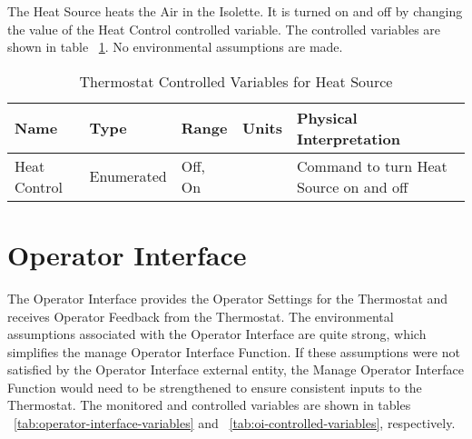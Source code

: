 The Heat Source heats the Air in the Isolette. It is turned on and off by changing the value of the
Heat Control controlled variable. The controlled variables are shown in table ~\ref{tab:heat-source-variables}. No
environmental assumptions are made.

\begin{table}
\begin{tabular}{|l|l|l|l|l|}
\hline
Name & Type & Range & Units & Physical Interpretation \\\hline
Heat Control & Enumerated & Off, On &  & Command to turn Heat Source on and off \\\hline
\end{tabular}
\caption{Thermostat Controlled Variables for Heat Source}
\label{tab:heat-source-variables}
\end{table}

\section{Operator Interface}
\label{sec:operator-interface}

The Operator Interface provides the Operator Settings for the Thermostat and receives Operator
Feedback from the Thermostat. The environmental assumptions associated with the Operator
Interface are quite strong, which simplifies the manage Operator Interface Function. If these
assumptions were not satisfied by the Operator Interface external entity, the Manage Operator
Interface Function would need to be strengthened to ensure consistent inputs to the Thermostat.
The monitored and controlled variables are shown in tables ~\ref{tab:operator-interface-variables} and ~\ref{tab:oi-controlled-variables}, respectively.

